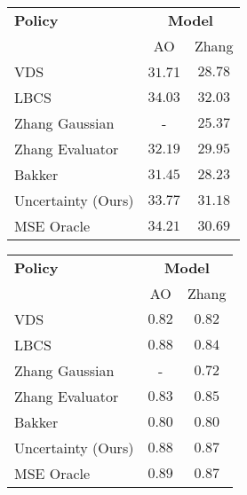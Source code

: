 \begin{figure}[h]
\begin{minipage}[c]{0.48\textwidth}
\begin{center}
    \begin{tabular}{lcc}
     \toprule
    \multirow{1}{*}{\textbf{Policy}}& \multicolumn{2}{c}{\textbf{Model}}\\
    \cmidrule{2-3} & AO & Zhang\\
    \midrule
    VDS & $31.7$1& $28.78$ \\
    LBCS & $\mathbf{34.03}$& $\mathbf{32.03}$\\
    Zhang Gaussian  & - & $25.37$\\
    Zhang Evaluator & $32.19$& $29.95$\\
    Bakker & $31.45$& $28.23$ \\
    Uncertainty (Ours) & $33.77$& $31.18$\\
    \midrule
    MSE Oracle &$34.21$ & $30.69$\\
    \bottomrule
    \end{tabular}
    \label{tab:comp_brain_psnr} 
\end{center}
\end{minipage}
\hfill
\begin{minipage}[c]{0.48\textwidth}
\begin{center}
     \begin{tabular}{lcc}
     \toprule
    \multirow{1}{*}{\textbf{Policy}}& \multicolumn{2}{c}{\textbf{Model}}\\
    \cmidrule{2-3} &AO & Zhang\\
    \midrule
    VDS & $0.82$ &$0.82$ \\
    LBCS &  $\mathbf{0.88}$& $0.84$\\
    Zhang Gaussian & - & $0.72$\\
    Zhang Evaluator & $0.83$& $0.85$\\
    Bakker &$0.80$ & $0.80$\\
    Uncertainty (Ours) & $\mathbf{0.88}$ & $\mathbf{0.87}$\\
    \midrule
    MSE Oracle & $0.89$& $0.87$\\
    \end{tabular}
    \label{tab:comp_brain_ssim} 
\end{center}
\end{minipage}
\end{figure}